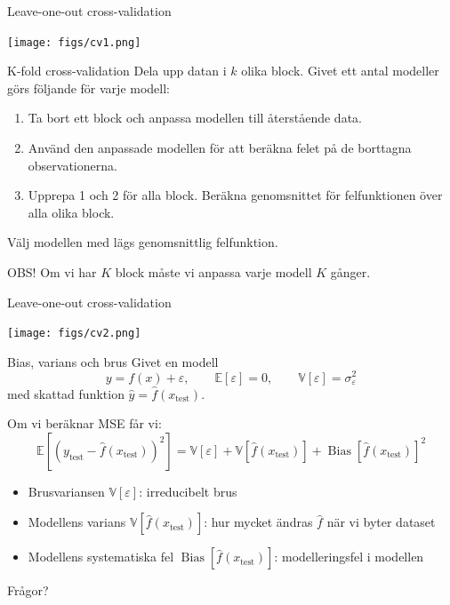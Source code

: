 \documentclass[10pt,english]{beamer}
\begin{document}
\begin{frame}{Leave-one-out cross-validation}
    \begin{center}
        \texttt{[image: figs/cv1.png]}
    \end{center}
\end{frame}

\begin{frame}{K-fold cross-validation}
    Dela upp datan i $k$ olika block. Givet ett antal modeller görs följande för varje modell:
    \begin{enumerate}
        \item Ta bort ett block och anpassa modellen till återstående data.
        \item Använd den anpassade modellen för att beräkna felet på de borttagna observationerna.
        \item Upprepa 1 och 2 för alla block. Beräkna genomsnittet för felfunktionen över alla olika block.
    \end{enumerate}
    Välj modellen med lägs genomsnittlig felfunktion.

    OBS! Om vi har $K$ block måste vi anpassa varje modell $K$ gånger.
\end{frame}

\begin{frame}{Leave-one-out cross-validation}
    \begin{center}
        \texttt{[image: figs/cv2.png]}
    \end{center}
\end{frame}

\begin{frame}{Bias, varians och brus}
    Givet en modell
    \begin{equation*}
        y = f(x) + \varepsilon, \qquad \mathbb{E}[\varepsilon] = 0, \qquad \mathbb{V}[\varepsilon] = \sigma^2_{\varepsilon}
    \end{equation*}
    med skattad funktion $\hat{y} = \hat{f}(x_{\text{test}})$.

    Om vi beräknar MSE får vi:
    \begin{equation*}
        \mathbb{E}\left[ \left( y_{\text{test}} - \hat{f}(x_{\text{test}}) \right)^2 \right] = \mathbb{V}[\varepsilon] + \mathbb{V}\left[\hat{f}(x_{\text{test}})\right] + \operatorname{Bias}\left[\hat{f}(x_{\text{test}})\right]^2
    \end{equation*}
    \begin{itemize}
        \item Brusvariansen $\mathbb{V}[\varepsilon]$: irreducibelt brus
        \item Modellens varians $\mathbb{V}[\hat{f}(x_{\text{test}})]$: hur mycket ändras $\hat{f}$ när vi byter dataset
        \item Modellens systematiska fel $\operatorname{Bias}[\hat{f}(x_{\text{test}})]$: modelleringsfel i modellen
    \end{itemize}
\end{frame}

\begin{frame}{Frågor?}
    
\end{frame}
\end{document}
